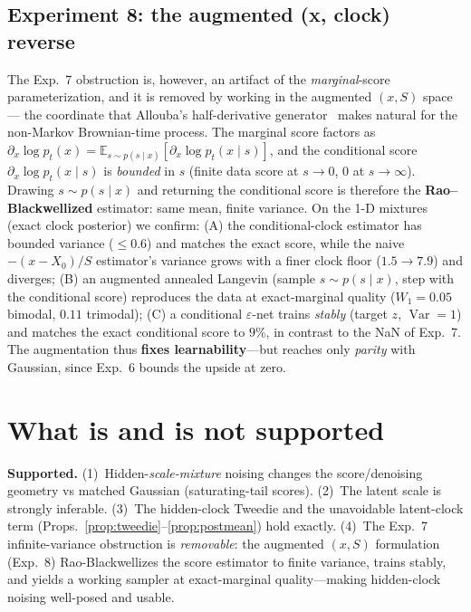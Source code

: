 \documentclass[11pt]{article}
\theoremstyle{definition}
\DeclareMathOperator{\Var}{Var}
\begin{document}
\subsection{Experiment 8: the augmented (x, clock) reverse}
The Exp.~7 obstruction is, however, an artifact of the \emph{marginal}-score
parameterization, and it is removed by working in the augmented $(x,S)$ space ---
the coordinate that Allouba's half-derivative generator~\cite{AllouZheng2001}
makes natural for the non-Markov Brownian-time process. The marginal score
factors as $\partial_x\log p_t(x)=\mathbb E_{s\sim p(s\mid x)}[\partial_x\log
p_t(x\mid s)]$, and the conditional score $\partial_x\log p_t(x\mid s)$ is
\emph{bounded} in $s$ (finite data score at $s\to0$, $0$ at $s\to\infty$).
Drawing $s\sim p(s\mid x)$ and returning the conditional score is therefore the
\textbf{Rao--Blackwellized} estimator: same mean, finite variance. On the 1-D
mixtures (exact clock posterior) we confirm: (A) the conditional-clock estimator
has bounded variance ($\le0.6$) and matches the exact score, while the naive
$-(x{-}X_0)/S$ estimator's variance grows with a finer clock floor
($1.5\!\to\!7.9$) and diverges; (B) an augmented annealed Langevin (sample
$s\sim p(s\mid x)$, step with the conditional score) reproduces the data at
exact-marginal quality ($W_1=0.05$ bimodal, $0.11$ trimodal); (C) a conditional
$\varepsilon$-net trains \emph{stably} (target $z$, $\Var=1$) and matches the
exact conditional score to $9\%$, in contrast to the NaN of Exp.~7. The
augmentation thus \textbf{fixes learnability}---but reaches only \emph{parity}
with Gaussian, since Exp.~6 bounds the upside at zero.

\section{What is and is not supported}
\textbf{Supported.} (1)~Hidden-\emph{scale-mixture} noising changes the
score/denoising geometry vs matched Gaussian (saturating-tail scores). (2)~The
latent scale is strongly inferable. (3)~The hidden-clock Tweedie and the
unavoidable latent-clock term (Props.~\ref{prop:tweedie}--\ref{prop:postmean})
hold exactly. (4)~The Exp.~7 infinite-variance obstruction is \emph{removable}:
the augmented $(x,S)$ formulation (Exp.~8) Rao-Blackwellizes the score estimator
to finite variance, trains stably, and yields a working sampler at exact-marginal
quality---making hidden-clock noising well-posed and usable.
\end{document}
